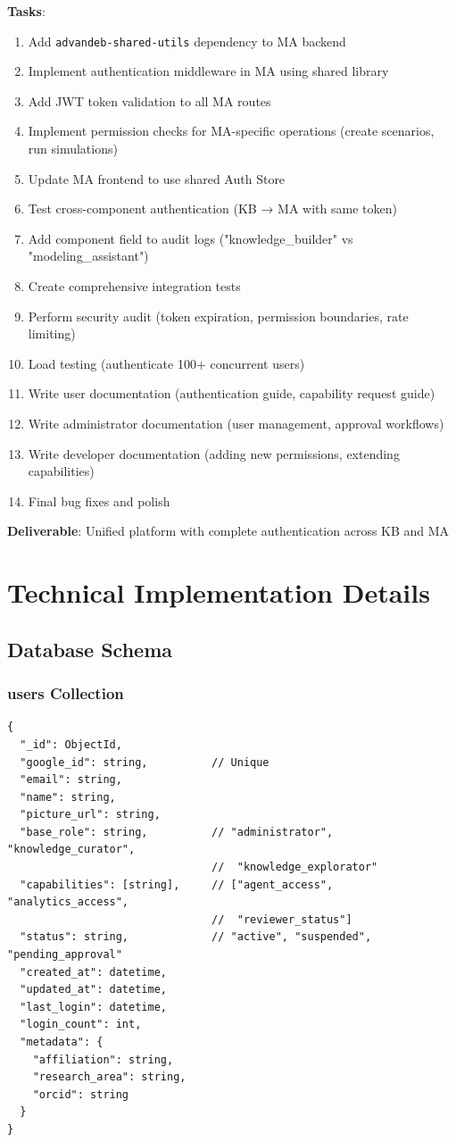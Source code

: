 \documentclass[12pt,a4paper]{article}
\begin{document}
\textbf{Tasks}:
\begin{enumerate}
    \item Add \texttt{advandeb-shared-utils} dependency to MA backend
    \item Implement authentication middleware in MA using shared library
    \item Add JWT token validation to all MA routes
    \item Implement permission checks for MA-specific operations (create scenarios, run simulations)
    \item Update MA frontend to use shared Auth Store
    \item Test cross-component authentication (KB → MA with same token)
    \item Add component field to audit logs ("knowledge\_builder" vs "modeling\_assistant")
    \item Create comprehensive integration tests
    \item Perform security audit (token expiration, permission boundaries, rate limiting)
    \item Load testing (authenticate 100+ concurrent users)
    \item Write user documentation (authentication guide, capability request guide)
    \item Write administrator documentation (user management, approval workflows)
    \item Write developer documentation (adding new permissions, extending capabilities)
    \item Final bug fixes and polish
\end{enumerate}

\textbf{Deliverable}: Unified platform with complete authentication across KB and MA

\section{Technical Implementation Details}

\subsection{Database Schema}

\subsubsection{users Collection}
\begin{verbatim}
{
  "_id": ObjectId,
  "google_id": string,          // Unique
  "email": string,
  "name": string,
  "picture_url": string,
  "base_role": string,          // "administrator", "knowledge_curator", 
                                //  "knowledge_explorator"
  "capabilities": [string],     // ["agent_access", "analytics_access", 
                                //  "reviewer_status"]
  "status": string,             // "active", "suspended", "pending_approval"
  "created_at": datetime,
  "updated_at": datetime,
  "last_login": datetime,
  "login_count": int,
  "metadata": {
    "affiliation": string,
    "research_area": string,
    "orcid": string
  }
}
\end{verbatim}
\end{document}
